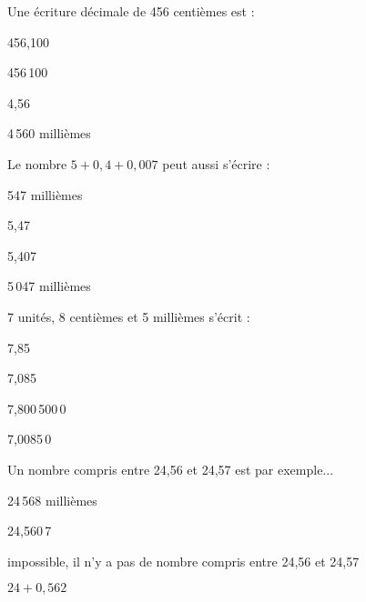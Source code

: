 \begin{QCM}
\begin{GroupeQCM}
    \begin{exercice}
      Une écriture décimale de 456 centièmes est :
      \begin{ChoixQCM}{4}
      \item 456,100
      \item 456\,100
      \item 4,56
      \item 4\,560 millièmes
      \end{ChoixQCM}
      \begin{corrige}
   \end{corrige}
    \end{exercice}


    \begin{exercice}
      Le nombre $5 + 0,4 + 0,007$ peut aussi s'écrire :
      \begin{ChoixQCM}{4}
      \item 547 millièmes
      \item 5,47
      \item 5,407
      \item 5\,047 millièmes
      \end{ChoixQCM}
      \begin{corrige}
   \end{corrige}
    \end{exercice}
    
     \begin{exercice}
      7 unités, 8 centièmes et 5 millièmes s'écrit :
      \begin{ChoixQCM}{4}
      \item 7,85
      \item 7,085
      \item 7,800\,500\,0
      \item 7,0085\,0
      \end{ChoixQCM}
      \begin{corrige}
   \end{corrige}
    \end{exercice}


     \begin{exercice}
      Un nombre compris entre 24,56 et 24,57 est par exemple...
      \begin{ChoixQCM}{4}
      \item 24\,568 millièmes
      \item 24,560\,7
      \item impossible, il n'y a pas de nombre compris entre 24,56 et 24,57
      \item $24 + 0,562$
      \end{ChoixQCM}
      \begin{corrige}
   \end{corrige}
    \end{exercice}
    

\end{GroupeQCM}
\end{QCM}
